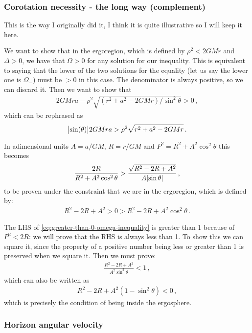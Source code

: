 \documentclass[main.tex]{subfiles}
\begin{document}
\subsubsection{Corotation necessity - the long way (complement)}

This is the way I originally did it, I think it is quite illustrative so I will keep it here.

We want to show that in the ergoregion, which is defined by \(\rho^2 < 2GMr\) and \(\Delta >0\), we have that \(\Omega > 0 \) for any solution for our inequality. This is equivalent to saying that the lower of the two solutions for the equality (let us say the lower one is \(\Omega_-\)) must be \(>0 \) in this case. The denominator is always positive, so we can discard it. Then we want to show that 
%
\begin{align}
2GMra - \rho^2 \sqrt{(r^2+a^2-2GMr) / \sin^2\theta }  > 0
\,,
\end{align}
%
which can be rephrased as 
%
\begin{align}
\abs{\sin(\theta )} 2GMra > \rho^2 \sqrt{r^2+a^2-2GMr}
\,.
\end{align}

In adimensional units \(A = a/GM\), \(R = r / GM\) and \(P^2 = R^2+A^2 \cos^2\theta \) this becomes 
%
\begin{align} \label{eq:greater-than-0-omega-inequality}
\frac{2R}{R^2+A^2 \cos^2\theta } > \frac{\sqrt{R^2-2R+A^2}}{A\abs{\sin \theta }}
\,,
\end{align}
%
to be proven under the constraint that we are in the ergoregion, which is defined by: 
%
\begin{align}
R^2- 2R + A^2 > 0 > R^2 - 2R + A^2 \cos^2\theta 
\,.
\end{align}

The LHS of \eqref{eq:greater-than-0-omega-inequality} is greater than 1 because of \(P^2<2R\): we will prove that the RHS is always less than 1. To show this we can square it, since the property of a positive  number being less or greater than 1 is preserved when we square it. Then we must prove: 
%
\begin{align}
\frac{R^2 - 2R + A^2}{A^2 \sin^2\theta } < 1 
\,,
\end{align}
%
which can also be written as 
%
\begin{align}
R^2 - 2R + A^2 (1 - \sin^2 \theta ) < 0
\,,
\end{align}
%
which is precisely the condition of being inside the ergosphere. 

\subsubsection{Horizon angular velocity}
\end{document}
